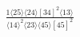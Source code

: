 \documentclass[varwidth, border=5pt]{standalone}
\begin{document}
\begin{my}
$\begin{gathered}
\scriptscriptstyle\frac{1⟨25⟩⟨24⟩[34]^2⟨13⟩}{⟨14⟩^2⟨23⟩⟨45⟩[45]^2}
\end{gathered}$
\end{my}
\end{document}
